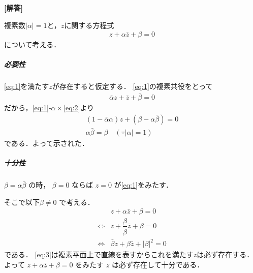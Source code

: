 \documentclass[../../main.tex]{subfiles}
\begin{document}
\begin{oframed}
  
\end{oframed}

{\bf [解答]}

複素数$|\alpha|=1$と，$z$に関する方程式
\begin{align}
  z + \alpha \bar{z} + \beta = 0 \label{eq:1}
\end{align}
について考える．

\subparagraph{必要性}

\cref{eq:1}を満たす$z$が存在すると仮定する．
\cref{eq:1}の複素共役をとって
\begin{align}
  \bar{\alpha} z + \bar{z} + \bar{\beta} = 0 \label{eq:2}
\end{align}
だから，\cref{eq:1}-$\alpha\times$\cref{eq:2}より
\begin{align}
  (1-\bar{\alpha}\alpha)z + (\beta-\alpha\bar{\beta}) = 0 \\
  \alpha \bar{\beta} = \beta \quad (\because |\alpha|=1)
\end{align}
である．よって示された．

\subparagraph{十分性}

$\beta = \alpha \bar{\beta}$ の時，
$\beta = 0$ ならば $z = 0$ が\cref{eq:1}をみたす．

そこで以下$\beta \neq 0$ で考える．
\begin{align}
  & z + \alpha \bar{z} + \beta = 0 \\
  \iff
  & z + \dfrac{\beta}{\bar{\beta}} \bar{z} + \beta = 0 \\
  \iff
  & \bar{\beta} z + \beta \bar{z} + |\beta|^2 = 0 \label{eq:3}
\end{align}
である．
\cref{eq:3}は複素平面上で直線を表すからこれを満たす$z$は必ず存在する．
よって $z + \alpha \bar{z} + \beta = 0$ をみたす $z$ は必ず存在して十分である．

\newpage
\end{document}
